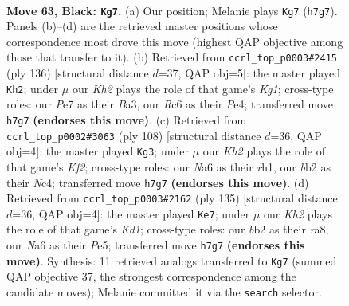 \documentclass[11pt]{article}
\begin{document}
\clearpage

\begin{figure}[p]\centering
\begin{subfigure}{0.46\textwidth}\centering
\resizebox{\linewidth}{!}{%
\newchessgame
\chessboard[
  setfen={8/4p2k/npr5/pN4p1/P1p5/2P3K1/1B1R4/8 b - - 7 63},
  showmover=false,
  pgfstyle=straightmove, color=movearrow, markmove={h7-g7}
]}
\caption{}
\end{subfigure}\hfill
\begin{subfigure}{0.46\textwidth}\centering
\resizebox{\linewidth}{!}{%
\newchessgame
\chessboard[
  setfen={R7/6k1/2r1bpp1/7p/4P2P/B4P2/6P1/6K1 w - - 62 69},
  showmover=false,
  pgfstyle=straightmove, color=movearrow, markmove={g1-h2}
]}
\caption{}
\end{subfigure}
\\[4pt]
\begin{subfigure}{0.46\textwidth}\centering
\resizebox{\linewidth}{!}{%
\newchessgame
\chessboard[
  setfen={8/6k1/2n3p1/6Pp/2N1R2P/1p6/1P3K2/7r w - - 11 55},
  showmover=false,
  pgfstyle=straightmove, color=movearrow, markmove={f2-g3}
]}
\caption{}
\end{subfigure}\hfill
\begin{subfigure}{0.46\textwidth}\centering
\resizebox{\linewidth}{!}{%
\newchessgame
\chessboard[
  setfen={R2k4/2p5/5rp1/2N1p2p/1Pb1P2P/6P1/1K6/8 b - - 15 68},
  showmover=false,
  pgfstyle=straightmove, color=movearrow, markmove={d8-e7}
]}
\caption{}
\end{subfigure}
\caption{\textbf{Move 63, Black: \texttt{Kg7}.} (a) Our position; Melanie plays \texttt{Kg7} (\texttt{h7g7}). Panels (b)--(d) are the retrieved master positions whose correspondence most drove this move (highest QAP objective among those that transfer to it). (b) Retrieved from \texttt{ccrl\_top\_p0003\#2415} (ply 136) [structural distance $d$=37, QAP obj=5]: the master played \texttt{Kh2}; under $\mu$ our \emph{Kh2} plays the role of that game's \emph{Kg1}; cross-type roles: our \emph{P}e7 as their \emph{B}a3, our \emph{R}c6 as their \emph{P}e4; transferred move \texttt{h7g7} \textbf{(endorses this move)}. (c) Retrieved from \texttt{ccrl\_top\_p0002\#3063} (ply 108) [structural distance $d$=36, QAP obj=4]: the master played \texttt{Kg3}; under $\mu$ our \emph{Kh2} plays the role of that game's \emph{Kf2}; cross-type roles: our \emph{N}a6 as their \emph{r}h1, our \emph{b}b2 as their \emph{N}c4; transferred move \texttt{h7g7} \textbf{(endorses this move)}. (d) Retrieved from \texttt{ccrl\_top\_p0003\#2162} (ply 135) [structural distance $d$=36, QAP obj=4]: the master played \texttt{Ke7}; under $\mu$ our \emph{Kh2} plays the role of that game's \emph{Kd1}; cross-type roles: our \emph{b}b2 as their \emph{r}a8, our \emph{N}a6 as their \emph{P}e5; transferred move \texttt{h7g7} \textbf{(endorses this move)}. Synthesis: 11 retrieved analogs transferred to \texttt{Kg7} (summed QAP objective 37, the strongest correspondence among the candidate moves); Melanie committed it via the \texttt{search} selector.}
\label{fig:thought-m125}
\end{figure}
\end{document}

